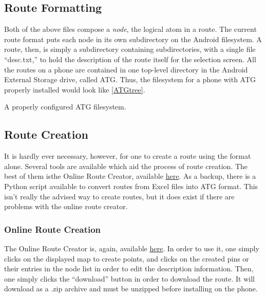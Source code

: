 \subsection{Route Formatting}
Both of the above files compose a \emph{node}, the logical atom in a route. The current route format puts each node in its own subdirectory
on the Android filesystem. A route, then, is simply a subdirectory containing subdirectories, with a single file ``desc.txt,'' to hold the
description of the route itself for the selection screen. All the routes on a phone are contained in one top-level directory in the
Android External Storage drive, called ATG. Thus, the filesystem for a phone with ATG properly installed would look like \ref{ATGtree}.
\begin{Tree}
\caption{A properly configured ATG filesystem.}\label{ATGtree}
\end{Tree}

\subsection{Route Creation}
It is hardly ever necessary, however, for one to create a route using the format alone. Several tools are available which aid the process of route creation. The best of them isthe Online Route Creator, available \href{https://epics.ecn.purdue.edu/drc/routeCreator.html}{here}. As a backup, there is a Python script available to convert routes from 
Excel files into ATG format. This isn't really the advised way to create routes, but it does exist if there are problems with the online route creator.

\subsubsection{Online Route Creation}
The Online Route Creator is, again, available \href{https://epics.ecn.purdue.edu/drc/routeCreator.html}{here}. In order to use it, one simply clicks on the displayed map to
create points, and clicks on the created pins or their entries in the node list in order to edit the description information. Then, one simply clicks the ``download'' button
in order to download the route. It will download as a .zip archive and must be unzipped before installing on the phone. 

